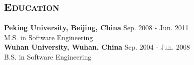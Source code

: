 \begin{resume}
\vspace*{-4pt}
\section{\textsc{Education}}

\textbf{Peking University, Beijing, China} \hfill Sep. 2008 - Jun. 2011 \\
M.S. in Software Engineering\\
\newline
\textbf{Wuhan University, Wuhan, China} \hfill Sep. 2004 - Jun. 2008 \\
B.S. in Software Engineering\\


\end{resume}



